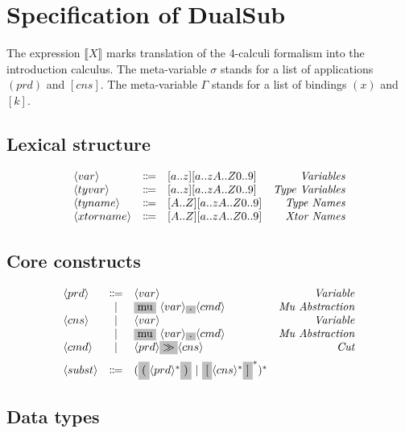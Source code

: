 \documentclass[11pt]{article}
\newcommand{\translate}[1]{\llbracket #1 \rrbracket}
\newcommand{\nonterminal}[1]{\langle #1 \rangle}
\newcommand{\terminal}[1]{\colorbox{lightgray}{#1}}
\begin{document}
\section{Specification of DualSub}

The expression $\translate{X}$ marks translation of the 4-calculi formalism into the introduction calculus.
The meta-variable $\sigma$ stands for a list of applications $(prd)$ and $[cns]$.
The meta-variable $\Gamma$ stands for a list of bindings $(x)$ and $[k]$.

\subsection{Lexical structure}
\[
  \begin{array}{lclr}
    \nonterminal{var} & \Coloneqq & [a..z][a..zA..Z0..9] & \emph{Variables} \\
    \nonterminal{tyvar} & \Coloneqq & [a..z][a..zA..Z0..9] & \emph{Type Variables} \\
    \nonterminal{tyname} & \Coloneqq & [A..Z][a..zA..Z0..9] & \emph{Type Names} \\
    \nonterminal{xtorname} & \Coloneqq & [A..Z][a..zA..Z0..9] & \emph{Xtor Names} \\
  \end{array}
\]

\subsection{Core constructs}
\[
  \begin{array}{lclr}
    \nonterminal{prd} & \Coloneqq & \nonterminal{var} & \emph{Variable} \\
    & | & \terminal{mu}\ \nonterminal{var} \terminal{.} \nonterminal{cmd} & \textit{Mu Abstraction} \\
    \nonterminal{cns} & | & \nonterminal{var} & \textit{Variable} \\
    & | & \terminal{mu}\ \nonterminal{var} \terminal{.} \nonterminal{cmd} & \textit{Mu Abstraction} \\
    \nonterminal{cmd} & | & \nonterminal{prd} \terminal{$\gg$} \nonterminal{cns} & \textit{Cut} \\[0.2cm]
    \nonterminal{subst} & \Coloneqq & (\terminal{(}\nonterminal{prd}^{\ast}\terminal{)}\ |\ \terminal{[}\nonterminal{cns}^{\ast}\terminal{]}^{\ast})^{\ast}
  \end{array}
\]

\subsection{Data types}
\end{document}
